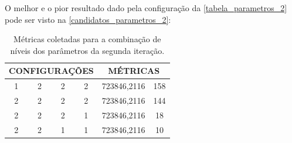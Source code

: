 \documentclass[
	12pt,				%
	twoside,			%
	a4paper,			%
	english,			%
	french,				%
	spanish,			%
	brazil				%
	]{abntex2}
\begin{document}
\begin{table}[ht]
    \centering
    \caption{Níveis propostos para os parâmetros do \textit{Simulated Annealing} na segunda iteração.}
    \label{tabela_parametros_2}
\end{table}

O melhor e o pior resultado dado pela configuração da
\autoref{tabela_parametros_2} pode ser visto na
\autoref{candidatos_parametros_2}:

\begin{table}[ht]
\centering
\caption{Métricas coletadas para a combinação de níveis dos parâmetros da segunda iteração.}
\label{candidatos_parametros_2}
    \begin{tabular}{|c|c|c|c|c|c|}
        \hline
        \multicolumn{4}{|c|}{\textbf{CONFIGURAÇÕES}} & \multicolumn{2}{c|}{\textbf{MÉTRICAS}} \\ \hline
        1          & 2          & 2          & 2          & 723846,2116                     & 158                  \\ \hline
        2          & 2          & 2          & 2          & 723846,2116                     & 144                  \\ \hline
        2          & 2          & 2          & 1          & 723846,2116                     & 18                   \\ \hline
        2          & 2          & 1          & 1          & 723846,2116                     & 10                   \\ \hline
    \end{tabular}%

\end{table}
\end{document}
